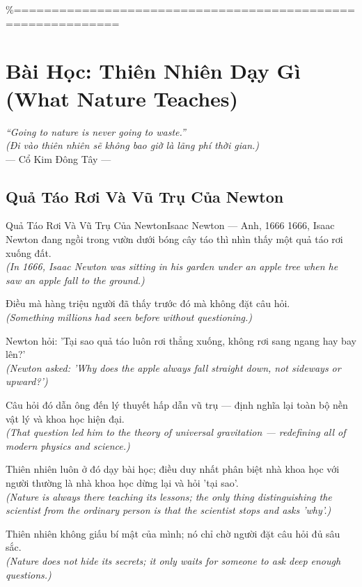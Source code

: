 \%============================================================
\chapter{Bài Học: Thiên Nhiên Dạy Gì (What Nature Teaches)}
\begin{center}
  \textit{\color{truyengold}``Going to nature is never going to waste.''}\\[4pt]
  \textit{(Đi vào thiên nhiên sẽ không bao giờ là lãng phí thời gian.)}\\[4pt]
  \small\color{truyenblue}--- Cổ Kim Đông Tây ---
\end{center}
\ngancach

\section{Quả Táo Rơi Và Vũ Trụ Của Newton}
\begin{truyen}{Quả Táo Rơi Và Vũ Trụ Của Newton}{Isaac Newton --- Anh, 1666}
 1666, Isaac Newton đang ngồi trong vườn dưới bóng cây táo thì nhìn thấy một quả táo rơi xuống đất.\\[4pt]
\textit{(In 1666, Isaac Newton was sitting in his garden under an apple tree when he saw an apple fall to the ground.)}

Điều mà hàng triệu người đã thấy trước đó mà không đặt câu hỏi.\\[4pt]
\textit{(Something millions had seen before without questioning.)}

Newton hỏi: 'Tại sao quả táo luôn rơi thẳng xuống, không rơi sang ngang hay bay lên?'\\[4pt]
\textit{(Newton asked: 'Why does the apple always fall straight down, not sideways or upward?')}

Câu hỏi đó dẫn ông đến lý thuyết hấp dẫn vũ trụ --- định nghĩa lại toàn bộ nền vật lý và khoa học hiện đại.\\[4pt]
\textit{(That question led him to the theory of universal gravitation --- redefining all of modern physics and science.)}

Thiên nhiên luôn ở đó dạy bài học; điều duy nhất phân biệt nhà khoa học với người thường là nhà khoa học dừng lại và hỏi 'tại sao'.\\[4pt]
\textit{(Nature is always there teaching its lessons; the only thing distinguishing the scientist from the ordinary person is that the scientist stops and asks 'why'.)}

\end{truyen}
\begin{baihoc}
  Thiên nhiên không giấu bí mật của mình; nó chỉ chờ người đặt câu hỏi đủ sâu sắc.\\[4pt]
  \textit{(Nature does not hide its secrets; it only waits for someone to ask deep enough questions.)}
\end{baihoc}

